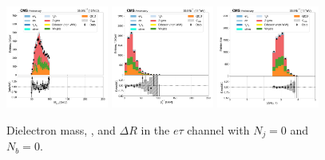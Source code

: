 \begin{figure}[htb!]
    \centering
    \includegraphics[width=0.3\textwidth]{chapters/Analysis/sectionPlots/figures/data_mc_overlays/etau_2016_cat_eq1_eq0_signal_linear_lepton_dilepton1_mass}
    \includegraphics[width=0.3\textwidth]{chapters/Analysis/sectionPlots/figures/data_mc_overlays/etau_2016_cat_eq1_eq0_signal_linear_lepton_dilepton1_pt}
    \includegraphics[width=0.3\textwidth]{chapters/Analysis/sectionPlots/figures/data_mc_overlays/etau_2016_cat_eq1_eq0_signal_linear_lepton_dilepton1_delta_r}
    \caption{Dielectron mass, \pt, and $\Delta R$ in the $e\tau$ channel
    with $N_{j} = 0$ and $N_{b} = 0$.}
    \label{fig:analysis:plots:etau_2_dilepton}
\end{figure}

